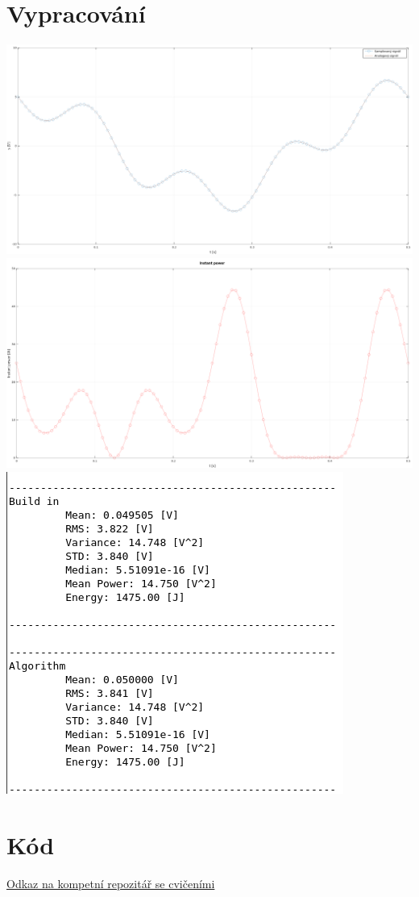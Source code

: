 \documentclass{article}
\begin{document}
\section{Vypracování}
\includegraphics[scale=0.25]{../assets/img2.png}
\includegraphics[scale=0.25]{../assets/img.png}
\includegraphics[scale=0.25]{../assets/img3.png}
\newpage
\section{Kód}

\href{https://github.com/AleshR/AP8ZS}{Odkaz na kompetní repozitář se cvičeními}
\end{document}
